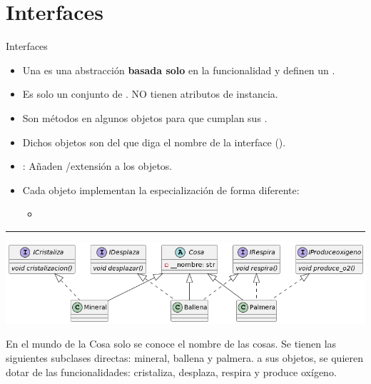 \documentclass[10pt, envcountsect , spanish]{beamer}
\begin{document}
\section{Interfaces}

\begin{frame}{Interfaces} 

\begin{itemize}
\item 
Una  es una abstracción \textbf{basada solo} en la funcionalidad y definen un .


\item
Es solo un conjunto de . NO tienen atributos de instancia.

\item
Son métodos  en algunos objetos para que cumplan sus .

\item 
Dichos objetos son del  que diga el nombre de la interface (). 

\item {}: Añaden /extensión a los objetos.

	\item 
	Cada objeto implementan la especialización de forma diferente:
		\begin{itemize} \small
		\item {}
		\end{itemize}
		
	
\end{itemize}

\vfill

\hrule

\vfill

\centerline{\includegraphics[width=.8\textwidth]{fig/mundoCosa}}

\small

En el mundo de la Cosa solo se conoce el nombre de las cosas.
Se tienen las siguientes subclases directas: mineral, ballena y palmera.
a sus objetos, se quieren dotar de las funcionalidades: cristaliza, desplaza, respira y produce oxígeno.
\end{frame}
\end{document}
